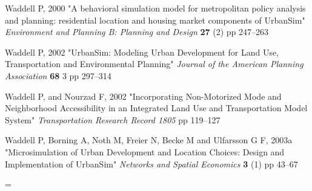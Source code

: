 Waddell P, 2000 "A behavioral simulation model for metropolitan
policy analysis and planning: residential location and housing
market components of UrbanSim" \textit{Environment and Planning B:
Planning and Design} \textbf{27} (2) pp 247--263

Waddell P, 2002 "UrbanSim: Modeling Urban Development for Land
Use, Transportation and Environmental Planning" \textit{Journal of
the American Planning Association} \textbf{68} 3 pp 297--314

Waddell P, and Nourzad F, 2002 "Incorporating Non-Motorized Mode
and Neighborhood Accessibility in an Integrated Land Use and
Transportation Model System" \textit{Transportation Research
Record 1805} pp 119--127

Waddell P, Borning A, Noth M, Freier N, Becke M and Ulfarsson G F,
2003a "Microsimulation of Urban Development and Location Choices:
Design and Implementation of UrbanSim" \textit{Networks and
Spatial Economics} \textbf{3} (1) pp 43--67


\parindent=\lengthstorage
\parskip=0pt

\appendix
\newpage
